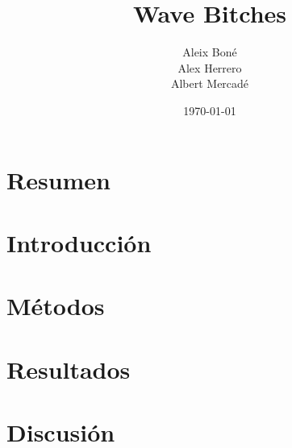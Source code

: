 

\title{
  Wave Bitches
}
\author{
  Aleix Boné\\
  Alex Herrero\\
  Albert Mercadé
}
\date{
  \today
}


\maketitle

\section{Resumen}%
\label{sec:resumen}

\section{Introducción}%
\label{sec:introduccion}

\section{Métodos}%
\label{sec:metodos}

\section{Resultados}%
\label{sec:resultados}

\section{Discusión}%
\label{sec:discusión}



